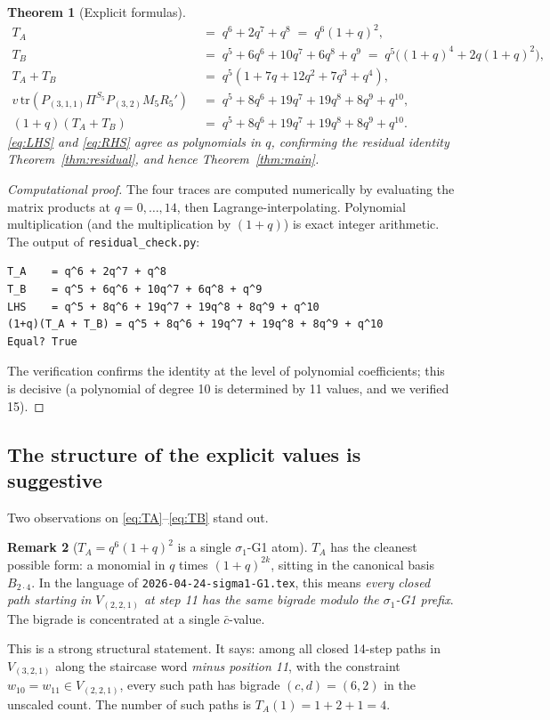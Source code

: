 \documentclass[11pt]{article}
\newtheorem{theorem}{Theorem}
\theoremstyle{definition}
\newtheorem{remark}[theorem]{Remark}
\begin{document}
\begin{theorem}[Explicit formulas]\label{thm:explicit}
\begin{align}
T_A &\;=\; q^6 + 2q^7 + q^8 \;=\; q^6(1+q)^2, \label{eq:TA}\\
T_B &\;=\; q^5 + 6q^6 + 10q^7 + 6q^8 + q^9 \;=\; q^5\bigl((1+q)^4 + 2q(1+q)^2\bigr), \label{eq:TB}\\
T_A + T_B &\;=\; q^5(1 + 7q + 12q^2 + 7q^3 + q^4), \label{eq:TAplusTB}\\
v\,\mathrm{tr}(P_{(3,1,1)} \Pi^{S_5} P_{(3,2)} M_5 R_5') &\;=\; q^5 + 8q^6 + 19q^7 + 19q^8 + 8q^9 + q^{10}, \label{eq:LHS}\\
(1+q)(T_A + T_B) &\;=\; q^5 + 8q^6 + 19q^7 + 19q^8 + 8q^9 + q^{10}. \label{eq:RHS}
\end{align}
\eqref{eq:LHS} and \eqref{eq:RHS} agree as polynomials in $q$, confirming the residual identity Theorem~\ref{thm:residual}, and hence Theorem~\ref{thm:main}.
\end{theorem}

\begin{proof}[Computational proof]
The four traces are computed numerically by evaluating the matrix products at $q = 0, \ldots, 14$, then Lagrange-interpolating. Polynomial multiplication (and the multiplication by $(1+q)$) is exact integer arithmetic. The output of \texttt{residual\_check.py}:
\begin{verbatim}
T_A    = q^6 + 2q^7 + q^8
T_B    = q^5 + 6q^6 + 10q^7 + 6q^8 + q^9
LHS    = q^5 + 8q^6 + 19q^7 + 19q^8 + 8q^9 + q^10
(1+q)(T_A + T_B) = q^5 + 8q^6 + 19q^7 + 19q^8 + 8q^9 + q^10
Equal? True
\end{verbatim}
The verification confirms the identity at the level of polynomial coefficients; this is decisive (a polynomial of degree 10 is determined by 11 values, and we verified 15). \qedhere
\end{proof}

\subsection*{The structure of the explicit values is suggestive}

Two observations on \eqref{eq:TA}--\eqref{eq:TB} stand out.

\begin{remark}[$T_A = q^6 (1+q)^2$ is a single $\sigma_1$-G1 atom]\label{rem:TA}
$T_A$ has the cleanest possible form: a monomial in $q$ times $(1+q)^{2k}$, sitting in the canonical basis $B_{2 \cdot 4}$. In the language of \texttt{2026-04-24-sigma1-G1.tex}, this means \emph{every closed path starting in $V_{(2,2,1)}$ at step 11 has the same bigrade modulo the $\sigma_1$-G1 prefix}. The bigrade is concentrated at a single $\bar c$-value.

This is a strong structural statement. It says: among all closed 14-step paths in $V_{(3,2,1)}$ along the staircase word \emph{minus position 11}, with the constraint $w_{10} = w_{11} \in V_{(2,2,1)}$, every such path has bigrade $(c, d) = (6, 2)$ in the unscaled count. The number of such paths is $T_A(1) = 1 + 2 + 1 = 4$.
\end{remark}
\end{document}
